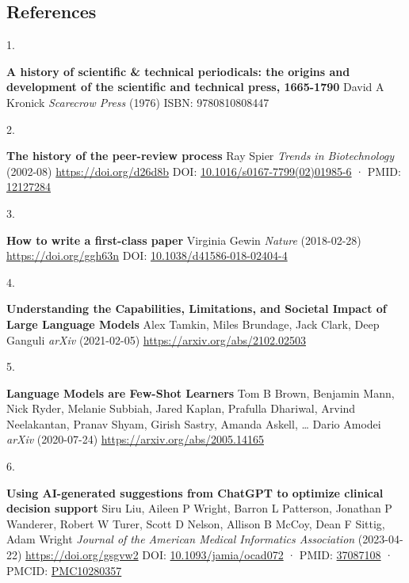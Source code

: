 \documentclass[
]{article}
\newlength{\cslhangindent}
\newlength{\csllabelwidth}
\newlength{\cslentryspacingunit} %
\newenvironment{CSLReferences}[2] %
 {%
  \setlength{\parindent}{0pt}
  \ifodd #1
  \let\oldpar\par
  \def\par{\hangindent=\cslhangindent\oldpar}
  \fi
  \setlength{\parskip}{#2\cslentryspacingunit}
 }%
 {}
\newcommand{\CSLBlock}[1]{#1\hfill\break}
\newcommand{\CSLLeftMargin}[1]{\parbox[t]{\csllabelwidth}{#1}}
\newcommand{\CSLRightInline}[1]{\parbox[t]{\linewidth - \csllabelwidth}{#1}\break}
\begin{document}
\subsection{References}

\hypertarget{refs}{}
\begin{CSLReferences}{0}{0}
\leavevmode{}%
\CSLLeftMargin{1. }%
\CSLRightInline{\textbf{A history of scientific \& technical periodicals: the origins and development of the scientific and technical press, 1665-1790}
\CSLBlock{David A Kronick} \emph{Scarecrow Press} (1976)
\CSLBlock{ISBN: 9780810808447}}

\leavevmode{}%
\CSLLeftMargin{2. }%
\CSLRightInline{\textbf{The history of the peer-review process}
\CSLBlock{Ray Spier} \emph{Trends in Biotechnology} (2002-08) \url{https://doi.org/d26d8b}
\CSLBlock{DOI: \href{https://doi.org/10.1016/s0167-7799(02)01985-6}{10.1016/s0167-7799(02)01985-6} · PMID: \href{https://www.ncbi.nlm.nih.gov/pubmed/12127284}{12127284}}}

\leavevmode{}%
\CSLLeftMargin{3. }%
\CSLRightInline{\textbf{How to write a first-class paper}
\CSLBlock{Virginia Gewin} \emph{Nature} (2018-02-28) \url{https://doi.org/ggh63n}
\CSLBlock{DOI: \href{https://doi.org/10.1038/d41586-018-02404-4}{10.1038/d41586-018-02404-4}}}

\leavevmode{}%
\CSLLeftMargin{4. }%
\CSLRightInline{\textbf{Understanding the Capabilities, Limitations, and Societal Impact of Large Language Models}
\CSLBlock{Alex Tamkin, Miles Brundage, Jack Clark, Deep Ganguli} \emph{arXiv} (2021-02-05) \url{https://arxiv.org/abs/2102.02503}}

\leavevmode{}%
\CSLLeftMargin{5. }%
\CSLRightInline{\textbf{Language Models are Few-Shot Learners}
\CSLBlock{Tom B Brown, Benjamin Mann, Nick Ryder, Melanie Subbiah, Jared Kaplan, Prafulla Dhariwal, Arvind Neelakantan, Pranav Shyam, Girish Sastry, Amanda Askell, \ldots{} Dario Amodei} \emph{arXiv} (2020-07-24) \url{https://arxiv.org/abs/2005.14165}}

\leavevmode{}%
\CSLLeftMargin{6. }%
\CSLRightInline{\textbf{Using AI-generated suggestions from ChatGPT to optimize clinical decision support}
\CSLBlock{Siru Liu, Aileen P Wright, Barron L Patterson, Jonathan P Wanderer, Robert W Turer, Scott D Nelson, Allison B McCoy, Dean F Sittig, Adam Wright} \emph{Journal of the American Medical Informatics Association} (2023-04-22) \url{https://doi.org/gsgvw2}
\CSLBlock{DOI: \href{https://doi.org/10.1093/jamia/ocad072}{10.1093/jamia/ocad072} · PMID: \href{https://www.ncbi.nlm.nih.gov/pubmed/37087108}{37087108} · PMCID: \href{https://www.ncbi.nlm.nih.gov/pmc/articles/PMC10280357}{PMC10280357}}}


\end{CSLReferences}
\end{document}

